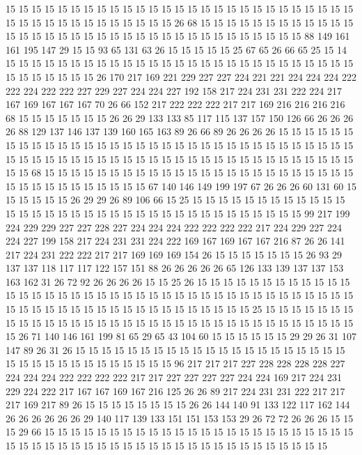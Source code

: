 15 15 15 15 15 15 15 15 15 15 15 15 15 15 15 15 15 15 15 15
15 15 15 15 15 15 15 15 15 15 15 15 15 15 15 15 15 15 15 15
26 68 15 15 15 15 15 15 15 15 15 15 15 15 15 15 15 15 15 15
15 15 15 15 15 15 15 15 15 15 15 15 15 15 15 15 15 88 149 161
161 195 147 29 15 15 93 65 131 63 26 15 15 15 15 15 25 67 65 26
66 65 25 15 14 15 15 15 15 15 15 15 15 15 15 15 15 15 15 15
15 15 15 15 15 15 15 15 15 15 15 15 15 15 15 15 15 15 15 26
170 217 169 221 229 227 227 224 221 221 224 224 224 222 222 224 222 222 227 229
227 224 224 227 192 158 217 224 231 231 222 224 217 167 169 167 167 167 70 26
66 152 217 222 222 222 217 217 169 216 216 216 216 68 15 15 15 15 15 15
15 26 26 29 133 133 85 117 115 137 157 150 126 66 26 26 26 26 88 129
137 146 137 139 160 165 163 89 26 66 89 26 26 26 26 15 15 15 15 15
15 15 15 15 15 15 15 15 15 15 15 15 15 15 15 15 15 15 15 15
15 15 15 15 15 15 15 15 15 15 15 15 15 15 15 15 15 15 15 15
15 15 15 15 15 15 15 15 15 15 15 15 15 15 15 15 15 68 15 15
15 15 15 15 15 15 15 15 15 15 15 15 15 15 15 15 15 15 15 15
15 15 15 15 15 15 15 15 15 15 15 15 15 67 140 146 149 199 197 67
26 26 26 60 131 60 15 15 15 15 15 15 26 29 29 26 89 106 66 15
25 15 15 15 15 15 15 15 15 15 15 15 15 15 15 15 15 15 15 15
15 15 15 15 15 15 15 15 15 15 15 15 15 15 15 15 99 217 199 224
229 229 227 227 228 227 224 224 224 222 222 222 222 217 224 229 227 224 224 227
199 158 217 224 231 231 224 222 169 167 169 167 167 216 87 26 26 141 217 224
231 222 222 217 217 169 169 169 154 26 15 15 15 15 15 15 15 26 93 29
137 137 118 117 117 122 157 151 88 26 26 26 26 26 65 126 133 139 137 137
153 163 162 31 26 72 92 26 26 26 26 15 15 25 26 15 15 15 15 15
15 15 15 15 15 15 15 15 15 15 15 15 15 15 15 15 15 15 15 15
15 15 15 15 15 15 15 15 15 15 15 15 15 15 15 15 15 15 15 15
15 15 15 15 15 15 15 15 15 15 15 15 15 25 15 15 15 15 15 15
15 15 15 15 15 15 15 15 15 15 15 15 15 15 15 15 15 15 15 15
15 15 15 15 15 15 15 15 15 26 71 140 146 161 199 81 65 29 65 43
104 60 15 15 15 15 15 15 29 29 26 31 107 147 89 26 31 26 15 15
15 15 15 15 15 15 15 15 15 15 15 15 15 15 15 15 15 15 15 15
15 15 15 15 15 15 15 15 15 15 15 15 96 217 217 217 227 228 228 228
228 227 224 224 224 222 222 222 222 217 217 227 227 227 227 224 224 169 217 224
231 229 224 222 217 167 167 169 167 216 125 26 26 89 217 224 231 231 222 217
217 217 169 217 89 26 15 15 15 15 15 15 15 15 26 26 144 140 91 133
122 117 162 144 26 26 26 26 26 26 29 140 117 139 133 151 151 153 153 29
26 72 72 26 26 26 15 15 15 29 66 15 15 15 15 15 15 15 15 15
15 15 15 15 15 15 15 15 15 15 15 15 15 15 15 15 15 15 15 15
15 15 15 15 15 15 15 15 15 15 15 15 15 15 15 15 15 15 15 15
